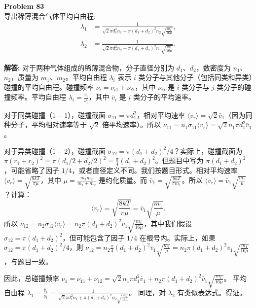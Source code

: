 \documentclass[12pt, a4paper, oneside]{ctexart}
\newenvironment{solution}{\par\noindent\textbf{解答:}\quad}{\par}
\begin{document}
\begin{mdframed}[backgroundcolor=gray!10, linewidth=0pt]
    \textbf{Problem 83} \\
    导出稀薄混合气体平均自由程:
    \[
    \begin{aligned}
        \lambda_1 &= \frac{1}{\sqrt{2} \pi d_1^2 n_1 + \pi (d_1 + d_2)^2 n_2 \sqrt{\frac{m_1}{16 \mu}}}, \\
        \lambda_2 &= \frac{1}{\sqrt{2} \pi d_2^2 n_2 + \pi (d_1 + d_2)^2 n_1 \sqrt{\frac{m_2}{16 \mu}}}.
    \end{aligned}
    \]
\end{mdframed}
\begin{solution}
    对于两种气体组成的稀薄混合物，分子直径分别为 $d_1$、$d_2$，数密度为 $n_1$、$n_2$，质量为 $m_1$、$m_2$。平均自由程 $\lambda_i$ 表示 $i$ 类分子与其他分子（包括同类和异类）碰撞的平均自由程。碰撞频率 $\nu_i = \nu_{i1} + \nu_{i2}$，其中 $\nu_{ij}$ 是 $i$ 类分子与 $j$ 类分子的碰撞频率。平均自由程 $\lambda_i = \frac{\bar{v}_i}{\nu_i}$，其中 $\bar{v}_i$ 是 $i$ 类分子的平均速率。

    对于同类碰撞（$1-1$），碰撞截面 $\sigma_{11} = \pi d_1^2$，相对平均速率 $\langle v_{r} \rangle = \sqrt{2} \bar{v}_1$（因为同种分子，平均相对速率等于 $\sqrt{2}$ 倍平均速率）。所以 $\nu_{11} = n_1 \sigma_{11} \langle v_r \rangle = \sqrt{2} n_1 \pi d_1^2 \bar{v}_1$。

    对于异类碰撞（$1-2$），碰撞截面 $\sigma_{12} = \pi (d_1 + d_2)^2 / 4$？实际上，碰撞截面为 $\pi (r_1 + r_2)^2 = \pi (d_1/2 + d_2/2)^2 = \frac{\pi}{4} (d_1 + d_2)^2$。但题目中写为 $\pi (d_1 + d_2)^2$，可能省略了因子 $1/4$，或者直径定义不同。我们按题目形式。相对平均速率 $\langle v_{r} \rangle = \sqrt{\frac{8kT}{\pi \mu}}$，其中 $\mu = \frac{m_1 m_2}{m_1 + m_2}$ 是约化质量。而 $\bar{v}_1 = \sqrt{\frac{8kT}{\pi m_1}}$。所以 $\langle v_r \rangle = \bar{v}_1 \sqrt{\frac{m_1}{\mu}}$？计算：
    \[
    \langle v_r \rangle = \sqrt{\frac{8kT}{\pi \mu}} = \bar{v}_1 \sqrt{\frac{m_1}{\mu}}.
    \]
    所以 $\nu_{12} = n_2 \sigma_{12} \langle v_r \rangle = n_2 \pi (d_1 + d_2)^2 \bar{v}_1 \sqrt{\frac{m_1}{16 \mu}}$，其中我们假设 $\sigma_{12} = \pi (d_1 + d_2)^2$，但可能包含了因子 $1/4$ 在根号内。实际上，如果 $\sigma_{12} = \pi (d_1 + d_2)^2 / 4$，则 $\nu_{12} = n_2 \frac{\pi}{4} (d_1 + d_2)^2 \bar{v}_1 \sqrt{\frac{m_1}{\mu}} = n_2 \pi (d_1 + d_2)^2 \bar{v}_1 \sqrt{\frac{m_1}{16 \mu}}$，与题目一致。

    因此，总碰撞频率 $\nu_1 = \nu_{11} + \nu_{12} = \sqrt{2} n_1 \pi d_1^2 \bar{v}_1 + n_2 \pi (d_1 + d_2)^2 \bar{v}_1 \sqrt{\frac{m_1}{16 \mu}}$。
    平均自由程 $\lambda_1 = \frac{\bar{v}_1}{\nu_1} = \frac{1}{\sqrt{2} \pi d_1^2 n_1 + \pi (d_1 + d_2)^2 n_2 \sqrt{\frac{m_1}{16 \mu}}}$。
    同理，对 $\lambda_2$ 有类似表达式。得证。
\end{solution}
\end{document}
